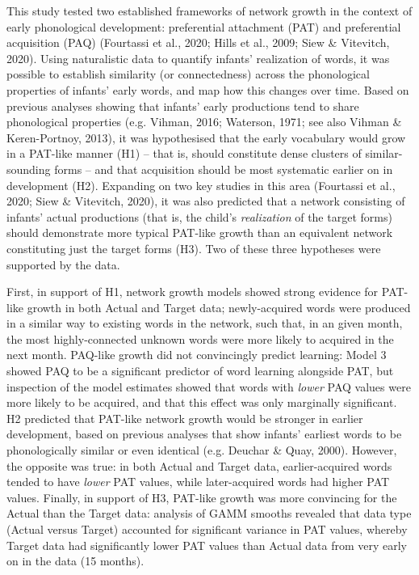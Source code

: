 \documentclass[
  man,mask,floatsintext]{apa6}
\begin{document}
This study tested two established frameworks of network growth in the context of early phonological development: preferential attachment (PAT) and preferential acquisition (PAQ) (Fourtassi et al., 2020; Hills et al., 2009; Siew \& Vitevitch, 2020). Using naturalistic data to quantify infants' realization of words, it was possible to establish similarity (or connectedness) across the phonological properties of infants' early words, and map how this changes over time. Based on previous analyses showing that infants' early productions tend to share phonological properties (e.g. Vihman, 2016; Waterson, 1971; see also Vihman \& Keren-Portnoy, 2013), it was hypothesised that the early vocabulary would grow in a PAT-like manner (H1) -- that is, should constitute dense clusters of similar-sounding forms -- and that acquisition should be most systematic earlier on in development (H2). Expanding on two key studies in this area (Fourtassi et al., 2020; Siew \& Vitevitch, 2020), it was also predicted that a network consisting of infants' actual productions (that is, the child's \emph{realization} of the target forms) should demonstrate more typical PAT-like growth than an equivalent network constituting just the target forms (H3). Two of these three hypotheses were supported by the data.

First, in support of H1, network growth models showed strong evidence for PAT-like growth in both Actual and Target data; newly-acquired words were produced in a similar way to existing words in the network, such that, in an given month, the most highly-connected unknown words were more likely to acquired in the next month. PAQ-like growth did not convincingly predict learning: Model 3 showed PAQ to be a significant predictor of word learning alongside PAT, but inspection of the model estimates showed that words with \emph{lower} PAQ values were more likely to be acquired, and that this effect was only marginally significant. H2 predicted that PAT-like network growth would be stronger in earlier development, based on previous analyses that show infants' earliest words to be phonologically similar or even identical (e.g. Deuchar \& Quay, 2000). However, the opposite was true: in both Actual and Target data, earlier-acquired words tended to have \emph{lower} PAT values, while later-acquired words had higher PAT values. Finally, in support of H3, PAT-like growth was more convincing for the Actual than the Target data: analysis of GAMM smooths revealed that data type (Actual versus Target) accounted for significant variance in PAT values, whereby Target data had significantly lower PAT values than Actual data from very early on in the data (15 months).
\end{document}
